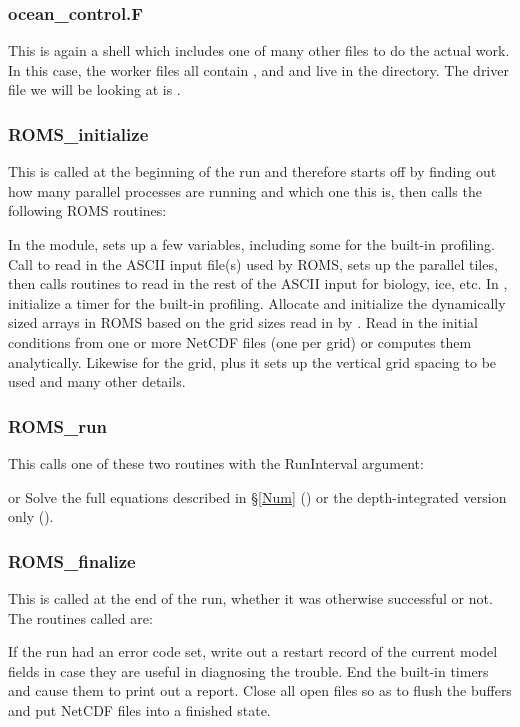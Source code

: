 \subsubsection{ocean\_control.F}
This is again a shell which includes one of many other files to do
the actual work. In this case, the worker files all contain
,  and 
and live in the  directory. The driver file we
will be looking at is .

\subsubsection{ROMS\_initialize}
This is called at the beginning of the run and therefore starts off
by finding out how many parallel processes are running and which one
this is, then calls the following ROMS routines:
\begin{klist}
   In the  module,
    sets up a few variables, including some for the built-in profiling.
   Call  to read in the ASCII input
    file(s) used by ROMS, sets up the parallel tiles, then calls
    routines to read in the rest of the ASCII input for biology, ice,
    etc.
   In , initialize a timer for
    the built-in profiling.
   Allocate and initialize the dynamically sized
    arrays in ROMS based on the grid sizes read in by .
   Read in the initial conditions from one or more NetCDF
    files (one per grid) or computes them analytically. Likewise
    for the grid, plus it sets up the vertical grid spacing to be
    used and many other details.
\end{klist}

\subsubsection{ROMS\_run}
This calls one of these two routines with the RunInterval argument:
\begin{klist}
   or  Solve the full
  equations described in \S\ref{Num} () or the depth-integrated
  version only ().
\end{klist}

\subsubsection{ROMS\_finalize}
This is called at the end of the run, whether it was otherwise
successful or not. The routines called are:
\begin{klist}
   If the run had an error code set, write out a
  restart record of the current model fields in case they are useful in
  diagnosing the trouble.
   End the built-in timers and cause them to print
  out a report.
   Close all open files so as to flush the buffers
  and put NetCDF files into a finished state.
\end{klist}

